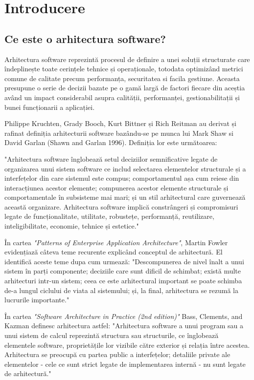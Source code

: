 \documentclass[12pt, a4paper, oneside, romanian]{teza-upb}
\begin{document}
\afterpreface 

\chapter{Introducere}
\section{Ce este o arhitectura software?}
Arhitectura software reprezintă procesul de definire a unei soluții structurate care îndeplinește toate cerințele tehnice și operaționale, totodata optimizând metrici comune de calitate precum performanța, securitatea si facila gestiune. Aceasta presupune o serie de decizii bazate pe o gamă largă de factori fiecare din aceștia având un impact considerabil asupra calității, performanței, gestionabilitații și bunei funcționarii a aplicației.

Philippe Kruchten, Grady Booch, Kurt Bittner și Rich Reitman au derivat și rafinat definiția arhitecturii software bazându-se pe munca lui Mark Shaw si David Garlan (Shawn and Garlan 1996). Definiția lor este următoarea:

"Arhitectura software înglobează setul deciziilor semnificative legate de organizarea unui sistem software ce includ selectarea elementelor structurale și a interfețelor din care sistemul este compus; comportamentul așa cum reiese din interacțiunea acestor elemente; compunerea acestor elemente structurale și comportamentale în subsisteme mai mari; și un stil arhitectural care guvernează această organizare. Arhitectura software implică constrângeri și compromisuri legate de funcționalitate, utilitate, robustețe, performanță, reutilizare, inteligibilitate, economie, tehnice și estetice."

În cartea \emph{"Patterns of Enterprise Application Architecture"}, Martin Fowler evidențiază câteva teme recurente explicând conceptul de arhitectură. El identifică aceste teme dupa cum urmează: "Descompunerea de nivel înalt a unui sistem în parți componente; deciziile care sunt dificil de schimbat; există multe arhitecturi intr-un sistem; ceea ce este arhitectural important se poate schimba de-a lungul ciclului de viata al sistemului; și, la final, arhitectura se rezumă la lucrurile importante."

În cartea \emph{"Software Architecture in Practice (2nd edition)"} Bass, Clements, and Kazman definesc arhitectura astfel: "Arhitectura software a unui program sau a unui sistem de calcul reprezintă structura sau structurile, ce înglobează elementele software, proprietățile lor vizibile către exterior și relația între acestea. Arhitectura se preocupă cu partea public a interfețelor; detaliile private ale elementelor - cele ce sunt strict legate de implementarea internă - nu sunt legate de arhitectură."
\end{document}
